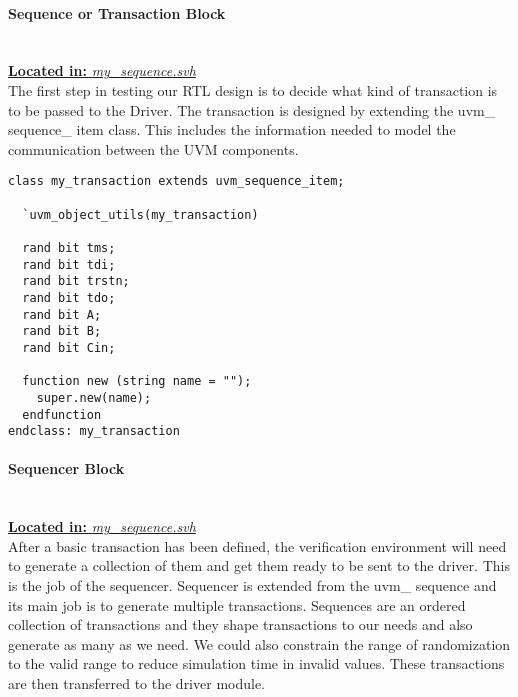 \documentclass[a4paper,11pt]{article}
\begin{document}
\FloatBarrier
\paragraph{Sequence or Transaction Block}\mbox{}\\
\underline{\textbf{Located in:} \textit{my\_sequence.svh}}\\

The first step in testing our RTL design is to decide what kind of transaction is to be passed to the Driver. The transaction is designed by extending the uvm\_ sequence\_ item class. This includes the information needed to model the communication between the UVM components.

\begin{lstlisting}[style={verilog-style}, backgroundcolor=\color{lightgray}]
class my_transaction extends uvm_sequence_item;

  `uvm_object_utils(my_transaction)

  rand bit tms;
  rand bit tdi;
  rand bit trstn;
  rand bit tdo;
  rand bit A;
  rand bit B;
  rand bit Cin;

  function new (string name = "");
    super.new(name);
  endfunction
endclass: my_transaction
\end{lstlisting}

\FloatBarrier
\paragraph{Sequencer Block}\mbox{}\\
\underline{\textbf{Located in:} \textit{my\_sequence.svh}}\\

After a basic transaction has been defined, the verification environment will need to generate a collection of them and get them ready to be sent to the driver. This is the job of the sequencer. Sequencer is extended from the uvm\_ sequence and its main job is to generate multiple transactions. Sequences are an ordered collection of transactions and they shape transactions to our needs and also generate as many as we need. We could also constrain the range of randomization to the valid range to reduce simulation time in invalid values. 
These transactions are then transferred to the driver module.
\end{document}
